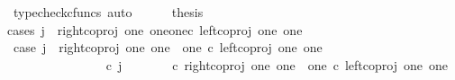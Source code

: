 \begin{isabellebody}
\ {\isacharparenleft}{\kern0pt}typecheck{\isacharunderscore}{\kern0pt}cfuncs{\isacharcomma}{\kern0pt}\ auto{\isacharparenright}{\kern0pt}\isanewline
\ \ \ \ \isamarkupfalse%
\ {\isacharquery}{\kern0pt}thesis\isanewline
\ \ \ \ \isamarkupfalse%
{\isacharparenleft}{\kern0pt}cases\ {\isachardoublequoteopen}j\ {\isacharequal}{\kern0pt}\ {\isacharparenleft}{\kern0pt}right{\isacharunderscore}{\kern0pt}coproj\ one\ {\isacharparenleft}{\kern0pt}one{\isasymCoprod}one{\isacharparenright}{\kern0pt}{\isasymcirc}\isactrlsub c\ left{\isacharunderscore}{\kern0pt}coproj\ one\ one{\isacharparenright}{\kern0pt}{\isachardoublequoteclose}{\isacharparenright}{\kern0pt}\isanewline
\ \ \ \ \ \ \isamarkupfalse%
\ case{}{\isacharcolon}{\kern0pt}\ {\isachardoublequoteopen}j\ {\isacharequal}{\kern0pt}\ right{\isacharunderscore}{\kern0pt}coproj\ one\ {\isacharparenleft}{\kern0pt}one\ {\isasymCoprod}\ one{\isacharparenright}{\kern0pt}\ {\isasymcirc}\isactrlsub c\ left{\isacharunderscore}{\kern0pt}coproj\ one\ one{\isachardoublequoteclose}\isanewline
\ \ \ \ \ \ \isamarkupfalse%
\ {\isachardoublequoteopen}{\isasymlangle}{\isasymt}{\isacharcomma}{\kern0pt}\ {\isasymf}{\isasymrangle}\ {\isacharequal}{\kern0pt}\ {\isasymlangle}{\isasymf}{\isacharcomma}{\kern0pt}{\isasymf}{\isasymrangle}{\isachardoublequoteclose}\isanewline
\ \ \ \ \ \ \isamarkupfalse%
\ {\isacharminus}{\kern0pt}\ \isanewline
\ \ \ \ \ \ \ \ \isamarkupfalse%
\ {\isachardoublequoteopen}{\isacharparenleft}{\kern0pt}{\isasymlangle}{\isasymt}{\isacharcomma}{\kern0pt}\ {\isasymt}{\isasymrangle}{\isasymamalg}\ {\isacharparenleft}{\kern0pt}{\isasymlangle}{\isasymt}{\isacharcomma}{\kern0pt}\ {\isasymf}{\isasymrangle}\ {\isasymamalg}{\isasymlangle}{\isasymf}{\isacharcomma}{\kern0pt}\ {\isasymt}{\isasymrangle}{\isacharparenright}{\kern0pt}{\isacharparenright}{\kern0pt}\ {\isasymcirc}\isactrlsub c\ j\ {\isacharequal}{\kern0pt}\ {\isacharparenleft}{\kern0pt}{\isacharparenleft}{\kern0pt}{\isasymlangle}{\isasymt}{\isacharcomma}{\kern0pt}\ {\isasymt}{\isasymrangle}{\isasymamalg}\ {\isacharparenleft}{\kern0pt}{\isasymlangle}{\isasymt}{\isacharcomma}{\kern0pt}\ {\isasymf}{\isasymrangle}\ {\isasymamalg}{\isasymlangle}{\isasymf}{\isacharcomma}{\kern0pt}\ {\isasymt}{\isasymrangle}{\isacharparenright}{\kern0pt}{\isacharparenright}{\kern0pt}\ {\isasymcirc}\isactrlsub c\ right{\isacharunderscore}{\kern0pt}coproj\ one\ {\isacharparenleft}{\kern0pt}one\ {\isasymCoprod}\ one{\isacharparenright}{\kern0pt}{\isacharparenright}{\kern0pt}\ {\isasymcirc}\isactrlsub c\ left{\isacharunderscore}{\kern0pt}coproj\ one\ one{\isachardoublequoteclose}\isanewline

\end{isabellebody}
